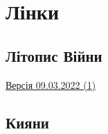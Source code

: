  
 
 
 
 
\section{Лінки}

\subsection{Літопис Війни}

\href{https://mega.nz/file/08E1QARZ#lptMoRBsXDBuR_CLQ98Wr44fUBqcVqFDVfKB6FTzgw0}{%
Версія 09.03.2022 (1)%
}

\subsection{Кияни}

